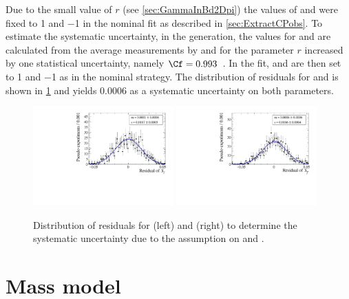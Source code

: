 Due to the small value of $r$ (see \cref{sec:GammaInBd2Dpi}) the values of \Cf and \Cfbar were fixed to \num{1} and \num{-1} in the nominal fit as described in \cref{sec:ExtractCPobs}. To estimate the systematic uncertainty, in the generation, the values for \Cf and \Cfbar are calculated from the average measurements by \belle and \babar for the parameter $r$ increased by one statistical uncertainty, namely $\Cf=0.993$~\cite{Aubert:2008zi, Das:2010be}.
In the fit, \Cf and \Cfbar are then set to \num{1} and \num{-1} as in the nominal strategy.
The distribution of residuals for \Sf and \Sfbar is shown in \cref{fig:systUncertC} and yields \num{0.0006} as a systematic uncertainty on both parameters.
\begin{figure}[tbp]
    \centering
    \includegraphics[width=0.48\textwidth]{11Systematics/figs/C_Sf_res.pdf}
    \includegraphics[width=0.48\textwidth]{11Systematics/figs/C_Sfbar_res.pdf}
    \caption{Distribution of residuals for \Sf (left) and \Sfbar (right) to determine the systematic uncertainty due to the assumption on \Cf and \Cfbar.}
    \label{fig:systUncertC}
\end{figure}

\section{Mass model}
\label{sec:SystUncertMass}

